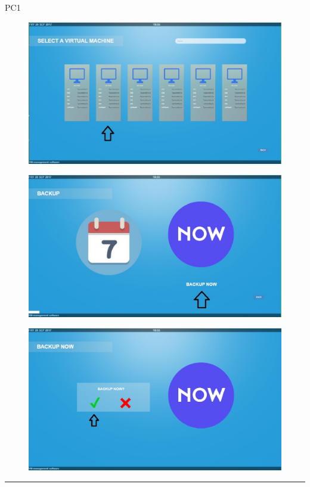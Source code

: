 \begin{lyxlist}{PC1}
\begin{figure}[H]
\centering
\includegraphics[width=170mm]{images/createVMMod2.eps}
\caption{\label{overflow}}
\end{figure}

\begin{figure}[H]
\centering
\includegraphics[width=170mm]{images/hotback3.eps}
\caption{\label{overflow}}
\end{figure}

\begin{figure}[H]
\centering
\includegraphics[width=170mm]{images/hotback4.eps}
\caption{\label{overflow}}
\end{figure}

\end{lyxlist}
\hrule
\vspace{0.5cm}










